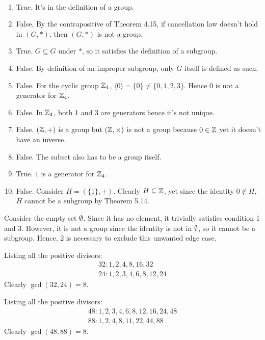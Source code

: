 \documentclass[12pt]{article}
\begin{document}
\begin{problem}[5.39]
~\begin{enumerate}[label=\alph*)]
	\item True. It's in the definition of a group.
	\item False, By the contrapositive of Theorem 4.15, if cancellation law doesn't hold in  $(G,*)$, then $(G,*)$ is not a group.
	\item True.  $G \subseteq G$ under $*$, so it satisfies the definition of a subgroup.
	\item False. By definition of an improper subgroup, only  $G$ itself is defined as such.
	\item False. For the cyclic group  $ \mathbb{Z}_4 $, $\langle 0 \rangle = \{0\} \neq \{0,1,2,3\} $. Hence $0$ is not a generator for  $ \mathbb{Z}_4$.
	\item False. In $ \mathbb{Z}_4$, both 1 and 3 are generators hence it's not unique.
	\item False. $ ( \mathbb{Z}, +)$ is a group but $ ( \mathbb{Z},\times )$ is not a group because $0 \in \mathbb{Z}$ yet it doesn't have an inverse.
	\item False. The subset also has to be a group itself.
	\item True. $1$ is a generator for  $ \mathbb{Z}_4$.
	\item False. Consider $H=(\{1\} ,+)$. Clearly $H \subseteq \mathbb{Z}$, yet since the identity $0 \not\in H$, $H$ cannot be a subgroup by Theorem 5.14.
\end{enumerate}
\end{problem}

\begin{problem}[5.44]
Consider the empty set $ \emptyset$. Since it has no element, it trivially satisfies condition 1 and 3. However, it is not a group since the identity is not in $ \emptyset$, so it cannot be a subgroup. Hence, 2 is necessary to exclude this unwanted edge case.
\end{problem}

\begin{problem}[6.5]
Listing all the positive divisors:
	\begin{align*}
	32: 1,2,4,8,16,32\\
	24:1,2,3,4,6,8,12,24
\end{align*}
Clearly $ \gcd ( 32,24) =8$.
\end{problem}

\begin{problem}[6.6]
Listing  all the positive divisors:
\begin{align*}
	48: 1,2,3,4,6,8,12,16,24,48\\
	88:1,2,4,8,11,22,44,88
\end{align*}
Clearly $ \gcd ( 48,88) =8$.
\end{problem}
\end{document}
